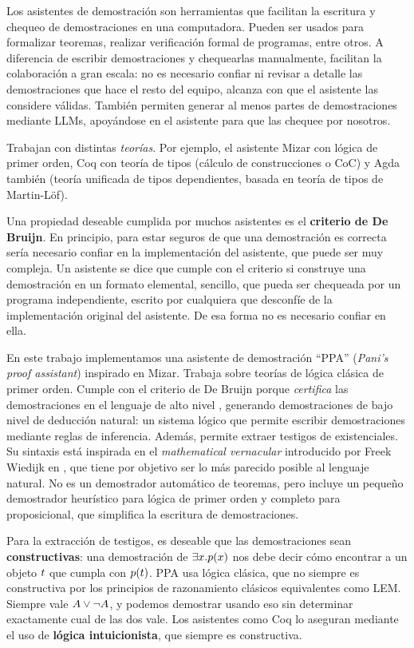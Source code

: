 Los asistentes de demostración son herramientas que facilitan la escritura y chequeo de demostraciones en una computadora. Pueden ser usados para formalizar teoremas, realizar verificación formal de programas, entre otros. A diferencia de escribir demostraciones y chequearlas manualmente, facilitan la colaboración a gran escala: no es necesario confiar ni revisar a detalle las demostraciones que hace el resto del equipo, alcanza con que el asistente las considere válidas. También permiten generar al menos partes de demostraciones mediante LLMs, apoyándose en el asistente para que las chequee por nosotros.

Trabajan con distintas \textit{teorías}. Por ejemplo, el asistente Mizar con lógica de primer orden, Coq con teoría de tipos (cálculo de construcciones o CoC) y Agda también (teoría unificada de tipos dependientes, basada en teoría de tipos de Martin-Löf).

Una propiedad deseable cumplida por muchos asistentes es el \textbf{criterio de De Bruijn}. En principio, para estar seguros de que una demostración es correcta sería necesario confiar en la implementación del asistente, que puede ser muy compleja. Un asistente se dice que cumple con el criterio si construye una demostración en un formato elemental, sencillo, que pueda ser chequeada por un programa independiente, escrito por cualquiera que desconfíe de la implementación original del asistente. De esa forma no es necesario confiar en ella.

En este trabajo implementamos una asistente de demostración ``PPA''
(\textit{Pani's proof assistant}) inspirado en Mizar. Trabaja sobre teorías de
lógica clásica de primer orden. Cumple con el criterio de De Bruijn porque
\textit{certifica} las demostraciones en el lenguaje de alto nivel \ppaLang{},
generando demostraciones de bajo nivel de deducción natural: un sistema lógico
que permite escribir demostraciones mediante reglas de inferencia. Además,
permite extraer testigos de existenciales. Su sintaxis está inspirada en el
\textit{mathematical vernacular} introducido por Freek Wiedijk en
\cite{freek-mv}, que tiene por objetivo ser lo más parecido posible al lenguaje
natural. No es un demostrador automático de teoremas, pero incluye un pequeño demostrador heurístico para lógica de primer orden y completo para proposicional, que simplifica la escritura de demostraciones.

Para la extracción de testigos, es deseable que las demostraciones sean
\textbf{constructivas}: una demostración de $\exists x . p(x)$ nos
debe decir cómo encontrar a un objeto $t$ que cumpla con $p(t)$. PPA
usa lógica clásica, que no siempre es constructiva por los principios de
razonamiento clásicos equivalentes como LEM. Siempre vale $A \vee \neg
A$, y podemos demostrar usando eso sin determinar exactamente cual de las
dos vale. Los asistentes como Coq lo aseguran mediante el uso de \textbf{lógica
intuicionista}, que siempre es constructiva.

